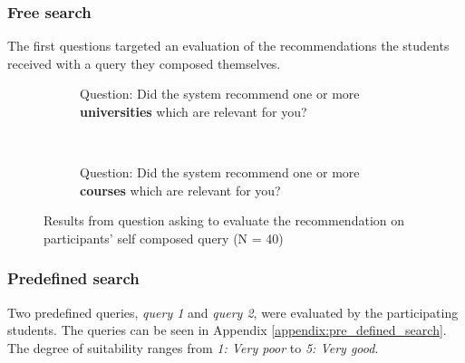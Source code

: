 \subsubsection{Free search}

The first questions targeted an evaluation of the recommendations the students received with a query they composed themselves.

\begin{figure}[H]
    \centering
    \begin{subfigure}[b]{0.4\textwidth}
        
        \caption{Question: Did the system recommend one or more \textbf{universities} which are relevant for you?}
        \label{fig:gull}
    \end{subfigure}
    ~ \qquad %
    \begin{subfigure}[b]{0.4\textwidth}
       
        \caption{Question: Did the system recommend one or more \textbf{courses} which are relevant for you?}
        \label{fig:tiger}
    \end{subfigure}
    \caption{Results from question asking to evaluate the recommendation on participants' self composed query (N = 40)}
\end{figure}

\subsubsection{Predefined search}

Two predefined queries, \textit{query 1} and \textit{query 2}, were evaluated by the participating students. The queries can be seen in Appendix \ref{appendix:pre_defined_search}. The degree of suitability ranges from \textit{1: Very poor} to \textit{5: Very good}.

